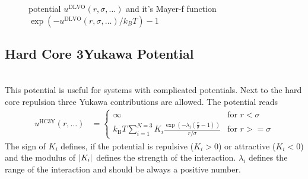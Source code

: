 \begin{figure}[htb]
\captionsetup[subfigure]{position=b}
\centering
{}
\hfill
{}
\caption{potential $u^\text{DLVO}(r,\sigma,\ldots)$ and it's Mayer-f function $\exp(-u^\text{DLVO}(r,\sigma,\ldots)/k_BT)-1$}
\end{figure}

\newpage
\subsection{Hard Core 3Yukawa Potential}
~\\

This potential is useful for systems with complicated potentials. Next to the hard core repulsion three
Yukawa contributions are allowed. The potential reads
\begin{align}
u^\text{HC3Y}(r,\ldots) &=
\begin{cases}
\infty                                                                  & \mbox{for } r<   \sigma \\
k_\text{B} T
\displaystyle \sum_{i=1}^{N=3} K_i\frac{\exp\left(-\lambda_i\left(\frac{r}{\sigma}-1\right)\right)}{r/\sigma}& \mbox{for } r >= \sigma
\end{cases}
\end{align}
The sign of $K_i$ defines, if the potential is
repulsive ($K_i>0$) or attractive ($K_i<0$) and the modulus of $\abs{K_i}$ defines the strength of the interaction. $\lambda_i$ defines the range of the interaction and should be always a positive number.


